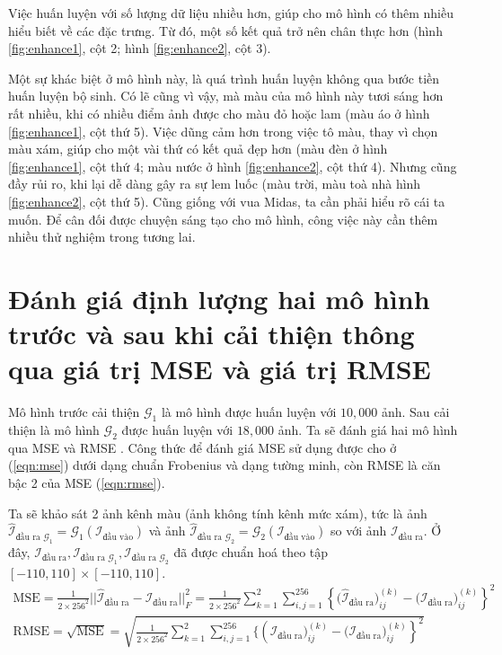 \documentclass[a4paper, 12pt]{report}
\begin{document}
Việc huấn luyện với số lượng dữ liệu nhiều hơn, giúp cho mô hình có thêm nhiều hiểu biết về các đặc trưng.
Từ đó, một số kết quả trở nên chân thực hơn (hình \ref{fig:enhance1}, cột 2; hình \ref{fig:enhance2}, cột 3).\vspace{5pt}

Một sự khác biệt ở mô hình này, là quá trình huấn luyện không qua bước tiền huấn luyện bộ sinh.
Có lẽ cũng vì vậy, mà màu của mô hình này tươi sáng hơn rất nhiều, khi có nhiều điểm ảnh được cho màu đỏ hoặc lam (màu áo ở hình \ref{fig:enhance1}, cột thứ 5).
Việc dũng cảm hơn trong việc tô màu, thay vì chọn màu xám, giúp cho một vài thứ có kết quả đẹp hơn (màu đèn ở hình \ref{fig:enhance1}, cột thứ 4; màu nước ở hình \ref{fig:enhance2}, cột thứ 4).
Nhưng cũng đầy rủi ro, khi lại dễ dàng gây ra sự lem luốc (màu trời, màu toà nhà hình \ref{fig:enhance2}, cột thứ 5).
Cũng giống với vua Midas, ta cần phải hiểu rõ cái ta muốn.
Để cân đối được chuyện sáng tạo cho mô hình, công việc này cần thêm nhiều thử nghiệm trong tương lai.

\section{Đánh giá định lượng hai mô hình trước và sau khi cải thiện thông qua giá trị MSE và giá trị RMSE}\label{mseandrmseeval}

Mô hình trước cải thiện $\mathcal{G}_1$ là mô hình được huấn luyện với $10,000$ ảnh.
Sau cải thiện là mô hình $\mathcal{G}_2$ được huấn luyện với $18,000$ ảnh.
Ta sẽ đánh giá hai mô hình qua MSE \cite{wikimse2021} và RMSE \cite{wikirmse2021}.
Công thức để đánh giá MSE sử dụng được cho ở (\ref{eqn:mse}) dưới dạng chuẩn Frobenius và dạng tường minh, còn RMSE là căn bậc 2 của MSE (\ref{eqn:rmse}).\vspace{5pt}

Ta sẽ khảo sát 2 ảnh kênh màu (ảnh không tính kênh mức xám), tức là ảnh $\widehat{\mathcal{I}}_{\text{đầu ra } \mathcal{G}_1} = \mathcal{G}_1\left(\mathcal{I}_{\text{đầu vào}}\right)$ và ảnh $\widehat{\mathcal{I}}_{\text{đầu ra } \mathcal{G}_2} = \mathcal{G}_2\left(\mathcal{I}_{\text{đầu vào}}\right)$ so với ảnh $\mathcal{I}_{\text{đầu ra}}$.
Ở đây, $\mathcal{I}_{\text{đầu ra}}, \mathcal{I}_{\text{đầu ra } \mathcal{G}_1}, \mathcal{I}_{\text{đầu ra } \mathcal{G}_2}$ đã được chuẩn hoá theo tập $[-110, 110] \times [-110, 110]$.
\begin{align}
    \text{MSE} = \frac{1}{2 \times 256^2}\Big|\Big| \widehat{\mathcal{I}}_{\text{đầu ra}} - \mathcal{I}_{\text{đầu ra}} \Big|\Big|^2_F = \frac{1}{2 \times 256^2}\sum_{k=1}^{2}\sum_{i, j=1}^{256}\left\{\Big(\widehat{\mathcal{I}}_{\text{đầu ra}}\Big)^{(k)}_{ij} - \Big(\mathcal{I}_{\text{đầu ra}}\Big)^{(k)}_{ij}\right\}^2 \label{eqn:mse}\\
    \text{RMSE} = \sqrt{\text{MSE}} = \sqrt{\frac{1}{2\times 256^2}\sum_{k=1}^{2}\sum_{i,  j=1}^{256}\Big\{\left(\widehat{\mathcal{I}}_{\text{đầu ra}}\Big)^{(k)}_{ij} - \Big(\mathcal{I}_{\text{đầu ra}}\Big)^{(k)}_{ij}\right\}^2} \label{eqn:rmse}
\end{align}
\end{document}
